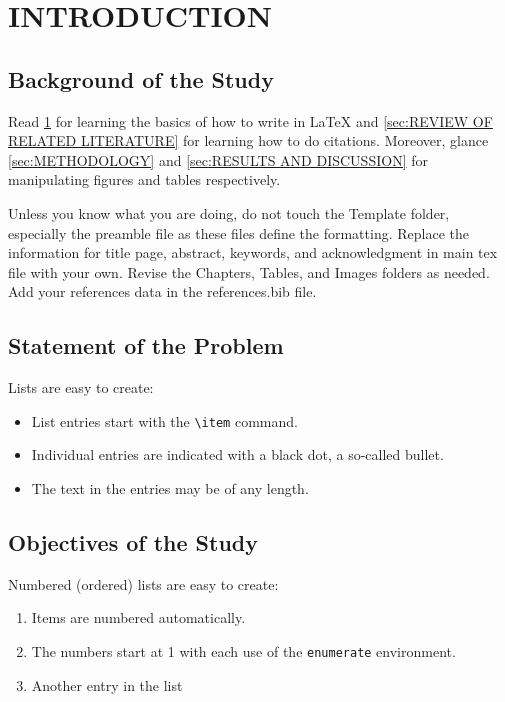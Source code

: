 \section{INTRODUCTION}
\label{sec:INTRODUCTION}

\subsection{Background of the Study}

Read \cref{sec:INTRODUCTION} for learning the basics of how to write in LaTeX and \cref{sec:REVIEW OF RELATED LITERATURE} for learning how to do citations. Moreover, glance \cref{sec:METHODOLOGY} and \cref{sec:RESULTS AND DISCUSSION} for manipulating figures and tables respectively.

Unless you know what you are doing, do not touch the Template folder, especially the preamble file as these files define the formatting. Replace the information for title page, abstract, keywords, and acknowledgment in main tex file with your own. Revise the Chapters, Tables, and Images folders as needed. Add your references data in the references.bib file.


\subsection{Statement of the Problem}

\noindent Lists are easy to create:
\begin{itemize}
  \item List entries start with the \verb|\item| command.
  \item Individual entries are indicated with a black dot, a so-called bullet.
  \item The text in the entries may be of any length.
\end{itemize}


\subsection{Objectives of the Study}

\noindent Numbered (ordered) lists are easy to create:
\begin{enumerate}
  \item Items are numbered automatically.
  \item The numbers start at 1 with each use of the \texttt{enumerate} environment.
  \item Another entry in the list
\end{enumerate}


